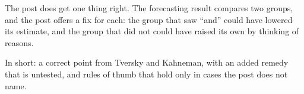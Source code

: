 \begin{afterword}
The post does get one thing right. The forecasting result compares two groups, and the post offers a fix for each: the group that saw ``and'' could have lowered its estimate, and the group that did not could have raised its own by thinking of reasons.

In short: a correct point from Tversky and Kahneman, with an added remedy that is untested, and rules of thumb that hold only in cases the post does not name.
\end{afterword}
